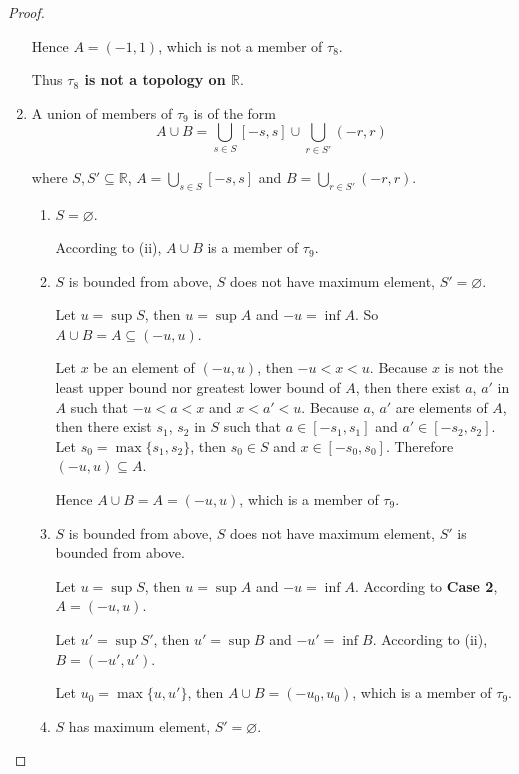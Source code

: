 \begin{proof}
\begin{enumerate}[label={(\roman*)}]
              Hence $A = (-1, 1)$, which is not a member of $\tau_{8}$.

              Thus \textbf{$\tau_{8}$ is not a topology on $\mathbb{R}$}.
        \item A union of members of $\tau_{9}$ is of the form
              \[
                  A\cup B = \bigcup_{s\in S} [-s, s] \cup \bigcup_{r\in S'} (-r, r)
              \]

              where $S, S'\subseteq\mathbb{R}$, $A =  \bigcup_{s\in S} [-s, s]$ and $B =  \bigcup_{r\in S'} (-r, r)$.
              \begin{enumerate}[label={\textbf{Case \arabic*.}},itemindent=1cm]
                  \item $S = \varnothing$.

                        According to (ii), $A\cup B$ is a member of $\tau_{9}$.
                  \item $S$ is bounded from above, $S$ does not have maximum element, $S' = \varnothing$.

                        Let $u = \sup S$, then $u = \sup A$ and $-u = \inf A$. So $A\cup B = A\subseteq (-u, u)$.

                        Let $x$ be an element of $(-u, u)$, then $-u < x < u$. Because $x$ is not the least upper bound nor greatest lower bound of $A$, then there exist $a$, $a'$ in $A$ such that $-u < a < x$ and $x < a' < u$. Because $a$, $a'$ are elements of $A$, then there exist $s_{1}$, $s_{2}$ in $S$ such that $a\in [-s_{1}, s_{1}]$ and $a'\in [-s_{2}, s_{2}]$. Let $s_{0} = \max\{ s_{1}, s_{2} \}$, then $s_{0}\in S$ and $x\in [-s_{0}, s_{0}]$. Therefore $(-u, u)\subseteq A$.

                        Hence $A\cup B = A = (-u, u)$, which is a member of $\tau_{9}$.
                  \item $S$ is bounded from above, $S$ does not have maximum element, $S'$ is bounded from above.

                        Let $u = \sup S$, then $u = \sup A$ and $-u = \inf A$. According to \textbf{Case 2}, $A = (-u, u)$.

                        Let $u' = \sup S'$, then $u' = \sup B$ and $-u' = \inf B$. According to (ii), $B = (-u', u')$.

                        Let $u_{0} = \max\{ u, u' \}$, then $A\cup B = (-u_{0}, u_{0})$, which is a member of $\tau_{9}$.
                  \item $S$ has maximum element, $S' = \varnothing$.


\end{enumerate}
\end{enumerate}
\end{proof}
